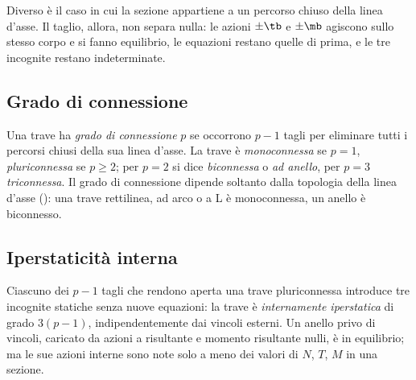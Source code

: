 Diverso è il caso in cui la sezione appartiene a un
percorso chiuso della linea d'asse. Il taglio, allora,
non separa nulla: le azioni $\pm\tb$ e $\pm\mb$ agiscono
sullo stesso corpo e si fanno equilibrio, le equazioni
restano quelle di prima, e le tre incognite restano
indeterminate.

\subsection{Grado di connessione}
\label{sec:grado_connessione}

Una trave ha \emph{grado di connessione}
$p$ se occorrono $p-1$ tagli per eliminare tutti i
percorsi chiusi della sua linea d'asse. La trave è
\emph{monoconnessa}
se $p = 1$, \emph{pluriconnessa}
se $p \geq 2$; per $p = 2$ si dice
\emph{biconnessa} o
\emph{ad anello}, per
$p = 3$ \emph{triconnessa}.
Il grado di connessione dipende soltanto dalla topologia
della linea d'asse (): una
trave rettilinea, ad arco o a L è monoconnessa, un anello
è biconnesso.



\subsection{Iperstaticità interna}
\label{sec:ipestat_interna}

Ciascuno dei $p-1$ tagli che rendono aperta una trave
pluriconnessa introduce tre incognite statiche senza
nuove equazioni: la trave è \emph{internamente
	iperstatica}
di grado $3(p-1)$, indipendentemente dai vincoli esterni.
Un anello privo di vincoli, caricato da azioni a
risultante e momento risultante nulli, è in equilibrio;
ma le sue azioni interne sono note solo a meno dei
valori di $N$, $T$, $M$ in una sezione.

